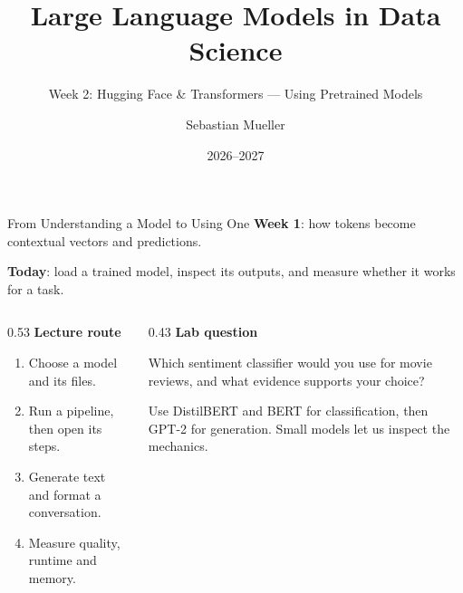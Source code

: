 \documentclass[aspectratio=169]{beamer}
\title{Large Language Models in Data Science}
\subtitle{Week 2: Hugging Face \& Transformers --- Using Pretrained Models}
\author{Sebastian Mueller}
\institute{Aix-Marseille Universit\'e}
\date{2026--2027}
\begin{document}
\begin{frame}[plain]\titlepage\end{frame}

\begin{frame}{From Understanding a Model to Using One}
  \textbf{Week 1}: how tokens become contextual vectors and predictions.
  \par\vspace{0.5em}
  \textbf{Today}: load a trained model, inspect its outputs, and measure whether it works for a task.
  \begin{columns}[T,onlytextwidth]
    \begin{column}{0.53\linewidth}
      \small\textbf{Lecture route}
      \begin{enumerate}
        \item Choose a model and its files.
        \item Run a pipeline, then open its steps.
        \item Generate text and format a conversation.
        \item Measure quality, runtime and memory.
      \end{enumerate}
    \end{column}
    \begin{column}{0.43\linewidth}
      \small\textbf{Lab question}
      \par Which sentiment classifier would you use for movie reviews, and what evidence supports your choice?
      \par\vspace{0.5em}
      Use DistilBERT and BERT for classification, then GPT-2 for generation. Small models let us inspect the mechanics.
    \end{column}
  \end{columns}
\end{frame}
\end{document}
